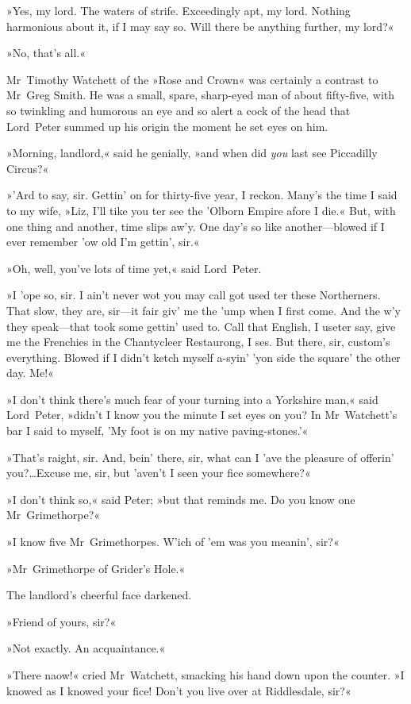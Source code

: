 »Yes, my lord. The waters of strife. Exceedingly apt, my lord. Nothing harmonious about it, if I may say so. Will there be anything further, my lord?«

»No, that's all.«

Mr~Timothy Watchett of the »Rose and Crown« was certainly a contrast to Mr~Greg Smith. He was a small, spare, sharp-eyed man of about fifty-five, with so twinkling and humorous an eye and so alert a cock of the head that Lord~Peter summed up his origin the moment he set eyes on him.

»Morning, landlord,« said he genially, »and when did \textit{you} last see Piccadilly Circus?«

»'Ard to say, sir. Gettin' on for thirty-five year, I reckon. Many's the time I said to my wife, »Liz, I'll tike you ter see the 'Olborn Empire afore I die.« But, with one thing and another, time slips aw'y. One day's so like another—blowed if I ever remember 'ow old I'm gettin', sir.«

»Oh, well, you've lots of time yet,« said Lord~Peter.

»I 'ope so, sir. I ain't never wot you may call got used ter these Northerners. That slow, they are, sir—it fair giv' me the 'ump when I first come. And the w'y they speak—that took some gettin' used to. Call that English, I useter say, give me the Frenchies in the Chantycleer Restaurong, I ses. But there, sir, custom's everything. Blowed if I didn't ketch myself a-syin' 'yon side the square' the other day. Me!«

»I don't think there's much fear of your turning into a Yorkshire man,« said Lord~Peter, »didn't I know you the minute I set eyes on you? In Mr~Watchett's bar I said to myself, 'My foot is on my native paving-stones.'«

»That's raight, sir. And, bein' there, sir, what can I 'ave the pleasure of offerin' you?\dots Excuse me, sir, but 'aven't I seen your fice somewhere?«

»I don't think so,« said Peter; »but that reminds me. Do you know one Mr~Grimethorpe?«

»I know five Mr~Grimethorpes. W'ich of 'em was you meanin', sir?«

»Mr~Grimethorpe of Grider's Hole.«

The landlord's cheerful face darkened.

»Friend of yours, sir?«

»Not exactly. An acquaintance.«

»There naow!« cried Mr~Watchett, smacking his hand down upon the counter. »I knowed as I knowed your fice! Don't you live over at Riddlesdale, sir?«

